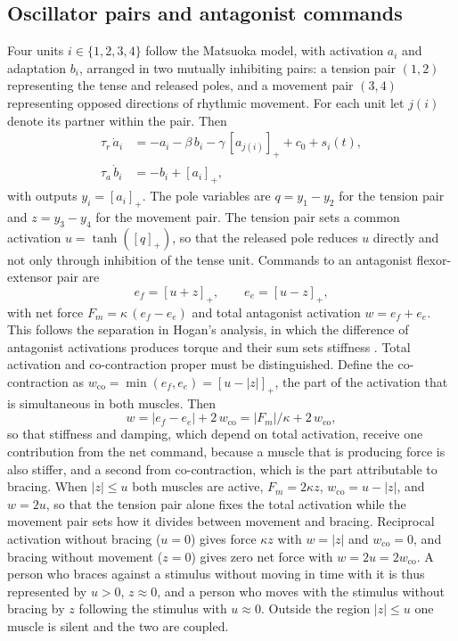 \documentclass[11pt]{article}
\theoremstyle{plain}
\theoremstyle{definition}
\newcommand{\pos}[1]{\left[#1\right]_{+}}
\begin{document}
\subsection{Oscillator pairs and antagonist commands}\label{sec:oscpairs}

Four units $i\in\{1,2,3,4\}$ follow the Matsuoka model, with activation $a_i$ and adaptation $b_i$, arranged in two mutually inhibiting pairs: a tension pair $(1,2)$ representing the tense and released poles, and a movement pair $(3,4)$ representing opposed directions of rhythmic movement. For each unit let $j(i)$ denote its partner within the pair. Then
\begin{align}
\tau_r\,\dot a_i &= -a_i - \beta\,b_i - \gamma\,\pos{a_{j(i)}} + c_0 + s_i(t),
\label{eq:matsuoka-a}\\
\tau_a\,\dot b_i &= -b_i + \pos{a_i},
\label{eq:matsuoka-b}
\end{align}
with outputs $y_i=\pos{a_i}$. The pole variables are $q=y_1-y_2$ for the tension pair and $z=y_3-y_4$ for the movement pair. The tension pair sets a common activation $u=\tanh(\pos{q})$, so that the released pole reduces $u$ directly and not only through inhibition of the tense unit. Commands to an antagonist flexor-extensor pair are
\begin{equation}
e_f=\pos{u+z}, \qquad e_e=\pos{u-z},
\label{eq:antagonist}
\end{equation}
with net force $F_m=\kappa\,(e_f-e_e)$ and total antagonist activation $w=e_f+e_e$. This follows the separation in Hogan's analysis, in which the difference of antagonist activations produces torque and their sum sets stiffness \citep{hogan1984}. Total activation and co-contraction proper must be distinguished. Define the co-contraction as $w_{\mathrm{co}}=\min(e_f,e_e)=\pos{u-|z|}$, the part of the activation that is simultaneous in both muscles. Then
\begin{equation}
w = |e_f-e_e| + 2\,w_{\mathrm{co}} = |F_m|/\kappa + 2\,w_{\mathrm{co}},
\label{eq:decomp}
\end{equation}
so that stiffness and damping, which depend on total activation, receive one contribution from the net command, because a muscle that is producing force is also stiffer, and a second from co-contraction, which is the part attributable to bracing. When $|z|\le u$ both muscles are active, $F_m=2\kappa z$, $w_{\mathrm{co}}=u-|z|$, and $w=2u$, so that the tension pair alone fixes the total activation while the movement pair sets how it divides between movement and bracing. Reciprocal activation without bracing ($u=0$) gives force $\kappa z$ with $w=|z|$ and $w_{\mathrm{co}}=0$, and bracing without movement ($z=0$) gives zero net force with $w=2u=2w_{\mathrm{co}}$. A person who braces against a stimulus without moving in time with it is thus represented by $u>0$, $z\approx 0$, and a person who moves with the stimulus without bracing by $z$ following the stimulus with $u\approx 0$. Outside the region $|z|\le u$ one muscle is silent and the two are coupled.
\end{document}

